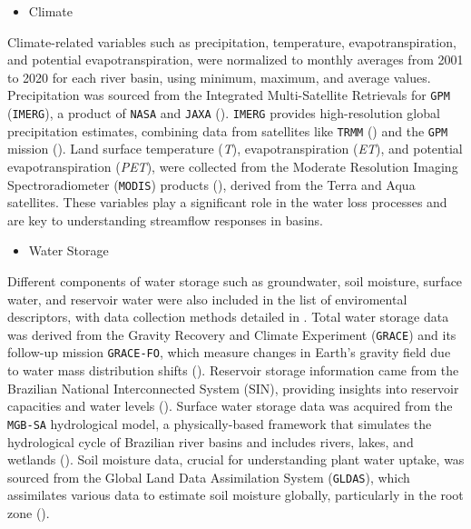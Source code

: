 \documentclass[12pt]{article}
\begin{document}
\begin{itemize}
    \item Climate
\end{itemize}

\par Climate-related variables such as precipitation, temperature, evapotranspiration, and potential evapotranspiration, were normalized to monthly averages from 2001 to 2020 for each river basin, using minimum, maximum, and average values. Precipitation was sourced from the Integrated Multi-Satellite Retrievals for \texttt{GPM} (\texttt{IMERG}), a product of \texttt{NASA} and \texttt{JAXA} (\cite{huffman2020}). \texttt{IMERG} provides high-resolution global precipitation estimates, combining data from satellites like \texttt{TRMM} (\cite{huffman2007}) and the \texttt{GPM} mission (\cite{skofronick2017}). Land surface temperature (\textit{T}), evapotranspiration (\textit{ET}), and potential evapotranspiration (\textit{PET}), were collected from the Moderate Resolution Imaging Spectroradiometer (\texttt{MODIS}) products (\cite{mu2007, mu2011i}), derived from the Terra and Aqua satellites. These variables play a significant role in the water loss processes and are key to understanding streamflow responses in basins.

\begin{itemize}
    \item Water Storage
\end{itemize}

\par Different components of water storage such as groundwater, soil moisture, surface water, and reservoir water were also included in the list of enviromental descriptors, with data collection methods detailed in \cite{barbedo2022a}. Total water storage data was derived from the Gravity Recovery and Climate Experiment (\texttt{GRACE}) and its follow-up mission \texttt{GRACE-FO}, which measure changes in Earth's gravity field due to water mass distribution shifts (\cite{landerer2020, tapley2004}). Reservoir storage information came from the Brazilian National Interconnected System (SIN), providing insights into reservoir capacities and water levels (\cite{ana2021}). Surface water storage data was acquired from the \texttt{MGB-SA} hydrological model, a physically-based framework that simulates the hydrological cycle of Brazilian river basins and includes rivers, lakes, and wetlands (\cite{siqueira2018}). Soil moisture data, crucial for understanding plant water uptake, was sourced from the Global Land Data Assimilation System (\texttt{GLDAS}), which assimilates various data to estimate soil moisture globally, particularly in the root zone (\cite{rodell2004}).
\end{document}

